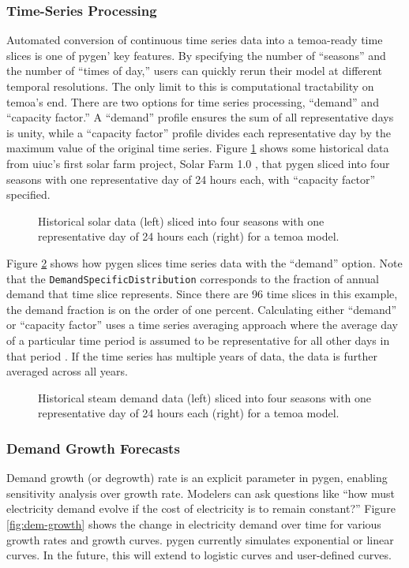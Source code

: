 \subsubsection{Time-Series Processing}
Automated conversion of continuous time series data into a \gls{temoa}-ready
time slices is one of \gls{pygen}' key features. By specifying the number of ``seasons''
and the number of ``times of day,'' users can quickly rerun their model at different
temporal resolutions. The only limit to this is computational tractability on
\gls{temoa}'s end. There are two options for time series processing, ``demand'' and
``capacity factor.'' A ``demand'' profile ensures the sum of all representative days is
unity, while a ``capacity factor'' profile divides each representative day by the
maximum value of the original time series.
Figure \ref{fig:solar-timeslice} shows some historical data from \gls{uiuc}'s
first solar farm project, Solar Farm 1.0 \cite{white_solar_2017}, that \gls{pygen}
sliced into four seasons with one representative day of 24 hours each, with ``capacity
factor'' specified.
\begin{figure}[H]
  \resizebox{\textwidth}{!}{}
  \caption{Historical solar data (left) sliced into four seasons with one
  representative day of 24 hours each (right) for a \gls{temoa} model.}
  \label{fig:solar-timeslice}
\end{figure}

Figure \ref{fig:steam-timeslice} shows how \gls{pygen} slices time series
data with the ``demand'' option. Note that the \texttt{DemandSpecificDistribution}
corresponds to the fraction of annual demand that time slice represents. Since
there are 96 time slices in this example, the demand fraction is on the order of one
percent. Calculating either ``demand'' or ``capacity factor'' uses a time series
averaging approach where the average day of a particular time period is assumed
to be representative for all other days in that period \cite{kotzur_impact_2018}.
If the time series has multiple years of data, the data is further averaged
across all years.

\begin{figure}[H]
  \resizebox{\textwidth}{!}{}
  \caption{Historical steam demand data (left) sliced into four seasons with one
  representative day of 24 hours each (right) for a \gls{temoa} model.}
  \label{fig:steam-timeslice}
\end{figure}

\subsubsection{Demand Growth Forecasts}
Demand growth (or degrowth) rate is an explicit parameter in \gls{pygen}, enabling
sensitivity analysis over growth rate. Modelers can ask questions like
``how must electricity demand evolve if the cost of electricity is to remain
constant?'' Figure \ref{fig:dem-growth} shows the change in electricity demand
over time for various growth rates and growth curves. \gls{pygen} currently simulates
exponential or linear curves. In the future, this will extend to logistic curves
and user-defined curves.

